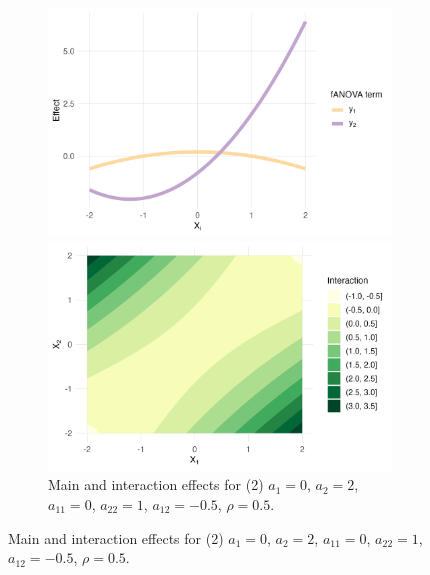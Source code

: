 \begin{figure}[htpb]
    \begin{subfigure}[t]{\textwidth}
        \centering
        \begin{minipage}[t]{0.49\textwidth}
            \includegraphics[width=\textwidth]{images/experiment_section/full_a1p00_a2p20_a11p00_a22p10_a12m05_rhop05_main.png}
        \end{minipage}%
        \hfill
        \begin{minipage}[t]{0.49\textwidth}
            \includegraphics[width=\textwidth]{images/experiment_section/full_a1p00_a2p20_a11p00_a22p10_a12m05_rhop05_interaction.png}
        \end{minipage}
        \caption{Main and interaction effects for (2) $a_1 = 0$, $a_2 = 2$, 
                 $a_{11} = 0$, $a_{22} = 1$, $a_{12} = -0.5$, $\rho = 0.5$.}
    \end{subfigure}


\end{figure}

